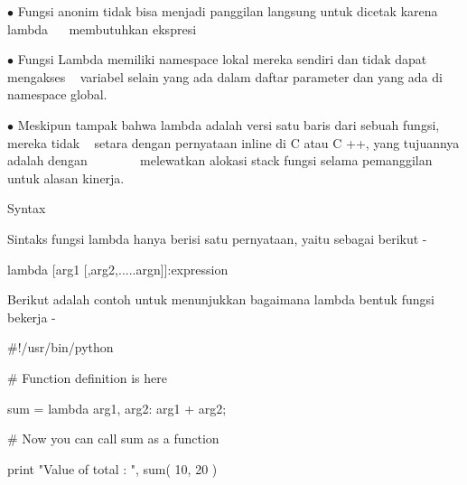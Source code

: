 \noindent 
 \hspace*{0.5in}  $ \bullet $ Fungsi anonim tidak bisa menjadi panggilan langsung untuk dicetak karena lambda  \hspace*{0.5in} ~~ membutuhkan ekspresi \par
\noindent 
 \hspace*{0.5in}  $ \bullet $ Fungsi Lambda memiliki namespace lokal mereka sendiri dan tidak dapat mengakses  \hspace*{0.5in} ~ variabel selain yang ada dalam daftar parameter dan yang ada di namespace global. \par
\noindent 
 \hspace*{0.5in}  $ \bullet $ Meskipun tampak bahwa lambda adalah versi satu baris dari sebuah fungsi, mereka tidak  \hspace*{0.5in} ~ setara dengan pernyataan inline di C atau C ++, yang tujuannya adalah dengan  \hspace*{0.5in} ~~~~~~~ melewatkan alokasi stack fungsi selama pemanggilan untuk alasan kinerja. \par
\vspace{12pt}
\noindent 
Syntax \par
\noindent 
Sintaks fungsi lambda hanya berisi satu pernyataan, yaitu sebagai berikut - \par
\noindent 
 \hspace*{0.5in} lambda [arg1 [,arg2,.....argn]]:expression \par
\noindent 
Berikut adalah contoh untuk menunjukkan bagaimana lambda bentuk fungsi bekerja - \par
\noindent 
 \hspace*{0.5in}  $  \#  $!/usr/bin/python \par
\vspace{12pt}
\noindent 
 \hspace*{0.5in}  $  \#  $ Function definition is here \par
\noindent 
 \hspace*{0.5in} sum = lambda arg1, arg2: arg1 + arg2; \par
\vspace{12pt}
\noindent 
  \par
\vspace{12pt}
\noindent 
 \hspace*{0.5in}  $  \#  $ Now you can call sum as a function \par
\noindent 
 \hspace*{0.5in} print "Value of total : ", sum( 10, 20 ) \par
